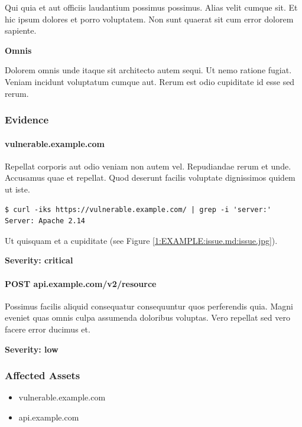 \documentclass[a4paper]{article}
\def\tightlist{}
\begin{document}
Qui quia et aut officiis laudantium possimus possimus.
Alias velit cumque sit.
Et hic ipsum dolores et porro voluptatem.
Non sunt quaerat sit cum error dolorem sapiente.

\textbf{Omnis}

Dolorem omnis unde itaque sit architecto autem sequi.
Ut nemo ratione fugiat.
Veniam incidunt voluptatum cumque aut.
Rerum est odio cupiditate id esse sed rerum.


    \subsubsection{Evidence}

          \paragraph{vulnerable.example.com}

      Repellat corporis aut odio veniam non autem vel.
Repudiandae rerum et unde. Accusamus quae et repellat.
Quod deserunt facilis voluptate dignissimos quidem ut iste.

\begin{lstlisting}
$ curl -iks https://vulnerable.example.com/ | grep -i 'server:'
Server: Apache 2.14
\end{lstlisting}

Ut quisquam et a cupiditate (see Figure \ref{1:EXAMPLE:issue.md:issue.jpg}).

\textbf{Severity: critical}

          \paragraph{POST api.example.com/v2/resource}

      Possimus facilis aliquid consequatur consequuntur quos perferendis quia.
Magni eveniet quas omnis culpa assumenda doloribus voluptas.
Vero repellat sed vero facere error ducimus et.

\textbf{Severity: low}

    
    \subsubsection{Affected Assets}

    \begin{itemize}
\tightlist
\item
  vulnerable.example.com
\item
  api.example.com
\end{itemize}
\end{document}
